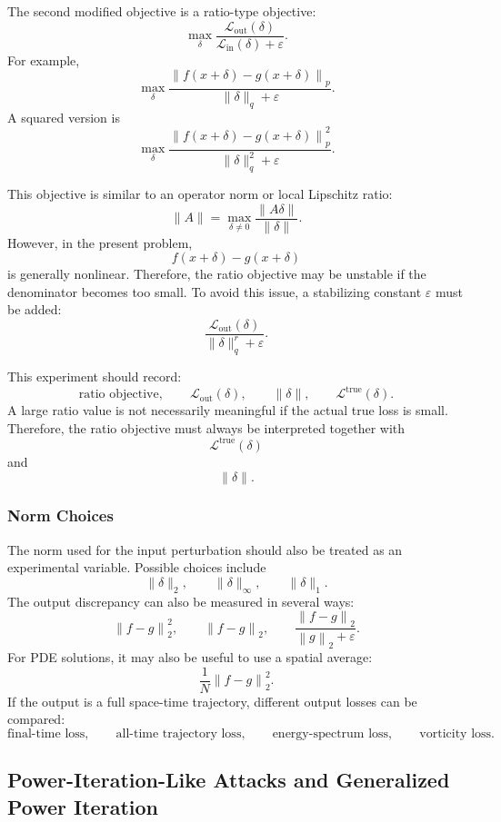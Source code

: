 \documentclass{article}
\begin{document}
The second modified objective is a ratio-type objective:
\[
\max_\delta
\frac{
\mathcal{L}_{\mathrm{out}}(\delta)
}{
\mathcal{L}_{\mathrm{in}}(\delta)+\varepsilon
}.
\]
For example,
\[
\max_\delta
\frac{
\left\|
f(x+\delta)-g(x+\delta)
\right\|_p
}{
\|\delta\|_q+\varepsilon
}.
\]
A squared version is
\[
\max_\delta
\frac{
\left\|
f(x+\delta)-g(x+\delta)
\right\|_p^2
}{
\|\delta\|_q^2+\varepsilon
}.
\]

This objective is similar to an operator norm or local Lipschitz ratio:
\[
\|A\|
=
\max_{\delta\neq 0}
\frac{\|A\delta\|}{\|\delta\|}.
\]
However, in the present problem,
\[
f(x+\delta)-g(x+\delta)
\]
is generally nonlinear. Therefore, the ratio objective may be unstable if the denominator becomes too small. To avoid this issue, a stabilizing constant \(\varepsilon\) must be added:
\[
\frac{
\mathcal{L}_{\mathrm{out}}(\delta)
}{
\|\delta\|_q^r+\varepsilon
}.
\]

This experiment should record:
\[
\text{ratio objective},
\qquad
\mathcal{L}_{\mathrm{out}}(\delta),
\qquad
\|\delta\|,
\qquad
\mathcal{L}^{\mathrm{true}}(\delta).
\]
A large ratio value is not necessarily meaningful if the actual true loss is small. Therefore, the ratio objective must always be interpreted together with
\[
\mathcal{L}^{\mathrm{true}}(\delta)
\]
and
\[
\|\delta\|.
\]

\subsubsection{Norm Choices}

The norm used for the input perturbation should also be treated as an experimental variable. Possible choices include
\[
\|\delta\|_2,
\qquad
\|\delta\|_\infty,
\qquad
\|\delta\|_1.
\]
The output discrepancy can also be measured in several ways:
\[
\left\|
f-g
\right\|_2^2,
\qquad
\left\|
f-g
\right\|_2,
\qquad
\frac{
\left\|
f-g
\right\|_2
}{
\left\|
g
\right\|_2+\varepsilon
}.
\]
For PDE solutions, it may also be useful to use a spatial average:
\[
\frac{1}{N}
\left\|
f-g
\right\|_2^2.
\]
If the output is a full space-time trajectory, different output losses can be compared:
\[
\text{final-time loss},
\qquad
\text{all-time trajectory loss},
\qquad
\text{energy-spectrum loss},
\qquad
\text{vorticity loss}.
\]

\subsection{Power-Iteration-Like Attacks and Generalized Power Iteration}
\end{document}
